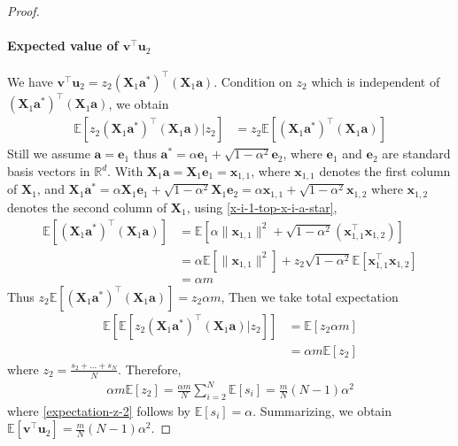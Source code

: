 \documentclass{article}
\theoremstyle{plain}
\theoremstyle{definition}
\theoremstyle{remark}
\begin{document}
\begin{proof}
    \paragraph{Expected value of $\mathbf{v}^\top \mathbf{u}_2$} We have $\mathbf{v}^\top \mathbf{u}_2 = z_2 (\mathbf{X}_1 \mathbf{a}^*)^\top (\mathbf{X}_1 \mathbf{a})$. Condition on $z_2$ which is independent of $(\mathbf{X}_1 \mathbf{a}^*)^\top (\mathbf{X}_1 \mathbf{a})$, we obtain
    \begin{align}
        \mathbb{E}\left[  z_2 (\mathbf{X}_1 \mathbf{a}^*)^\top (\mathbf{X}_1 \mathbf{a}) |z_2\right] & = z_2 \mathbb{E}\left[  (\mathbf{X}_1 \mathbf{a}^*)^\top (\mathbf{X}_1 \mathbf{a}) \right] 
    \end{align}
Still we assume $\mathbf{a}=\mathbf{e}_1$ thus $\mathbf{a}^*=\alpha \mathbf{e}_1+\sqrt{1-\alpha^2}\mathbf{e}_2$, where $\mathbf{e}_1$ and $\mathbf{e}_2$ are standard basis vectors in $\mathbb{R}^d$. 
With $\mathbf{X}_1\mathbf{a}=\mathbf{X}_1 \mathbf{e}_1=\mathbf{x}_{1,1}$, where $\mathbf{x}_{1,1}$ denotes the first column of $\mathbf{X}_1$, and $\mathbf{X}_1\mathbf{a}^* = \alpha \mathbf{X}_1 \mathbf{e}_1+\sqrt{1-\alpha^2}\mathbf{X}_1 \mathbf{e}_2= \alpha \mathbf{x}_{1,1} + \sqrt{1-\alpha^2} \mathbf{x}_{1,2}$ where $\mathbf{x}_{1,2}$ denotes the second column of $\mathbf{X}_{1}$, using \eqref{x-i-1-top-x-i-a-star}, 
\begin{align}
    \mathbb{E}\left[  (\mathbf{X}_1 \mathbf{a}^*)^\top (\mathbf{X}_1 \mathbf{a}) \right] &= \mathbb{E}\left[ \alpha \| \mathbf{x}_{1,1}\|^2 + \sqrt{1-\alpha^2} (\mathbf{x}_{1,1}^\top \mathbf{x}_{1,2})\right] \\
    & =  \alpha \mathbb{E}\left[ \| \mathbf{x}_{1,1}\|^2 \right] + z_2 \sqrt{1-\alpha^2} \mathbb{E}\left[ \mathbf{x}_{1,1}^\top \mathbf{x}_{1,2}\right] \\
    & = \alpha m \label{exp-x1-a-x-1-a-star}
\end{align}
Thus $z_2 \mathbb{E}\left[  (\mathbf{X}_1 \mathbf{a}^*)^\top (\mathbf{X}_1 \mathbf{a}) \right]= z_2 \alpha m$, Then we take total expectation
\begin{align}
\mathbb{E}\left[\mathbb{E}\left[  z_2 (\mathbf{X}_1 \mathbf{a}^*)^\top (\mathbf{X}_1 \mathbf{a}) |z_2\right]\right] &= \mathbb{E}\left[ z_2 \alpha m \right] \\
& = \alpha m \mathbb{E}\left[ z_2 \right]
\end{align}
where $z_2=\frac{s_2+\dots +s_N}{N}$. Therefore,
\begin{align}
    \alpha m \mathbb{E}\left[ z_2 \right] = \frac{\alpha m}{N} \sum_{i=2}^N \mathbb{E}\left[s_i\right]
    =\frac{ m}{N} (N-1) \alpha^2 \label{expectation-z-2}
\end{align}
where \eqref{expectation-z-2} follows by $\mathbb{E}\left[ s_i \right]=\alpha$. Summarizing, we obtain $\mathbb{E}\left[ \mathbf{v}^\top \mathbf{u}_2\right]= \frac{ m}{N} (N-1) \alpha^2$.




\end{proof}
\end{document}
